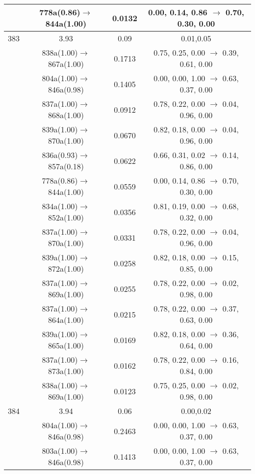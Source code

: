 \documentclass[10pt,a4paper]{article}
\begin{document}
\begin{longtable}{c|c|c|c}
 	& 778a(0.86)$\rightarrow$844a(1.00) &	 0.0132 &	 0.00, 0.14, 0.86 $\rightarrow$ 0.70, 0.30, 0.00 \\ 
 \hline383 &	 3.93 &	 0.09 &	 0.01,0.05 \\ 
  	& 838a(1.00)$\rightarrow$867a(1.00) &	 0.1713 &	 0.75, 0.25, 0.00 $\rightarrow$ 0.39, 0.61, 0.00 \\ 
 	& 804a(1.00)$\rightarrow$846a(0.98) &	 0.1405 &	 0.00, 0.00, 1.00 $\rightarrow$ 0.63, 0.37, 0.00 \\ 
 	& 837a(1.00)$\rightarrow$868a(1.00) &	 0.0912 &	 0.78, 0.22, 0.00 $\rightarrow$ 0.04, 0.96, 0.00 \\ 
 	& 839a(1.00)$\rightarrow$870a(1.00) &	 0.0670 &	 0.82, 0.18, 0.00 $\rightarrow$ 0.04, 0.96, 0.00 \\ 
 	& 836a(0.93)$\rightarrow$857a(0.18) &	 0.0622 &	 0.66, 0.31, 0.02 $\rightarrow$ 0.14, 0.86, 0.00 \\ 
 	& 778a(0.86)$\rightarrow$844a(1.00) &	 0.0559 &	 0.00, 0.14, 0.86 $\rightarrow$ 0.70, 0.30, 0.00 \\ 
 	& 834a(1.00)$\rightarrow$852a(1.00) &	 0.0356 &	 0.81, 0.19, 0.00 $\rightarrow$ 0.68, 0.32, 0.00 \\ 
 	& 837a(1.00)$\rightarrow$870a(1.00) &	 0.0331 &	 0.78, 0.22, 0.00 $\rightarrow$ 0.04, 0.96, 0.00 \\ 
 	& 839a(1.00)$\rightarrow$872a(1.00) &	 0.0258 &	 0.82, 0.18, 0.00 $\rightarrow$ 0.15, 0.85, 0.00 \\ 
 	& 837a(1.00)$\rightarrow$869a(1.00) &	 0.0255 &	 0.78, 0.22, 0.00 $\rightarrow$ 0.02, 0.98, 0.00 \\ 
 	& 837a(1.00)$\rightarrow$864a(1.00) &	 0.0215 &	 0.78, 0.22, 0.00 $\rightarrow$ 0.37, 0.63, 0.00 \\ 
 	& 839a(1.00)$\rightarrow$865a(1.00) &	 0.0169 &	 0.82, 0.18, 0.00 $\rightarrow$ 0.36, 0.64, 0.00 \\ 
 	& 837a(1.00)$\rightarrow$873a(1.00) &	 0.0162 &	 0.78, 0.22, 0.00 $\rightarrow$ 0.16, 0.84, 0.00 \\ 
 	& 838a(1.00)$\rightarrow$869a(1.00) &	 0.0123 &	 0.75, 0.25, 0.00 $\rightarrow$ 0.02, 0.98, 0.00 \\ 
 \hline384 &	 3.94 &	 0.06 &	 0.00,0.02 \\ 
  	& 804a(1.00)$\rightarrow$846a(0.98) &	 0.2463 &	 0.00, 0.00, 1.00 $\rightarrow$ 0.63, 0.37, 0.00 \\ 
 	& 803a(1.00)$\rightarrow$846a(0.98) &	 0.1413 &	 0.00, 0.00, 1.00 $\rightarrow$ 0.63, 0.37, 0.00 \\ 

\end{longtable}
\end{document}
